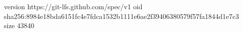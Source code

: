 version https://git-lfs.github.com/spec/v1
oid sha256:8984e18bda6151fc4e7fdca1532b1111e6ae2f39406380579f57fa1844d1e7c3
size 43840
